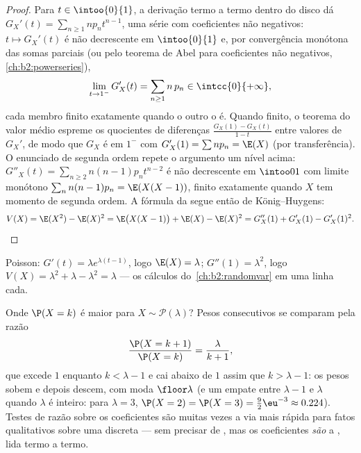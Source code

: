 \begin{proof}
Para $t \in \intoo{0}{1}$, a derivação termo a termo dentro do
disco dá $G_X'(t) = \sum_{n\geq1} np_n t^{n-1}$, uma série com
coeficientes não negativos: $t \mapsto G_X'(t)$ é não decrescente em
$\intoo{0}{1}$ e, por convergência monótona das somas parciais (ou pelo
teorema de Abel para coeficientes não negativos,
\cref{ch:b2:powerseries}),
\[
\lim_{t \to 1^-} G_X'(t)
= \sum_{n\geq1} n\,p_n \in \intcc{0}{+\infty} ,
\]
cada membro finito exatamente quando o outro o é. Quando finito, o teorema do
valor médio espreme os quocientes de diferenças $\frac{G_X(1) -
G_X(t)}{1 - t}$ entre valores de $G_X'$, de modo que $G_X$ é
 em $1^-$ com $G_X'(1) = \sum np_n = \E(X)$ (por
transferência). O enunciado de segunda ordem repete o argumento um nível
acima: $G''_X(t) = \sum_{n\geq2}n(n-1)p_nt^{n-2}$ é
não decrescente em $\intoo01$ com limite monótono
$\sum_nn(n-1)p_n = \E(X(X-1))$, finito exatamente quando $X$ tem
momento de segunda ordem. A fórmula da  segue então de
König--Huygens:
\[
V(X) = \E(X^2) - \E(X)^2 = \E\bigl(X(X-1)\bigr) + \E(X) -
\E(X)^2 = G''_X(1) + G'_X(1) - G'_X(1)^2 .
\]
\end{proof}

\begin{example}
Poisson: $G'(t) = \lambda e^{\lambda(t-1)}$, logo $\E(X) = \lambda$;
$G''(1) = \lambda^2$, logo $V(X) = \lambda^2 + \lambda - \lambda^2 =
\lambda$ --- os cálculos do~\cref{ch:b2:randomvar} em uma
linha cada.
\end{example}

\begin{example}
\label{ex:b2:genfun:poissonmode}
Onde $\P(X = k)$ é maior para $X \sim \mathcal
P(\lambda)$? Pesos consecutivos se comparam pela razão
\[
\frac{\P(X = k+1)}{\P(X = k)} = \frac{\lambda}{k + 1} ,
\]
que excede $1$ enquanto $k < \lambda - 1$ e cai abaixo de
$1$ assim que $k > \lambda - 1$: os pesos sobem e depois descem, com
moda $\floor\lambda$ (e um empate entre $\lambda - 1$ e
$\lambda$ quando $\lambda$ é inteiro: para $\lambda = 3$,
$\P(X = 2) = \P(X = 3) = \frac92\eu^{-3} \approx 0.224$).
Testes de razão sobre os coeficientes são muitas vezes a via mais rápida
para fatos qualitativos sobre uma  discreta --- sem precisar de , mas os coeficientes \emph{são} a
, lida termo a termo.
\end{example}

